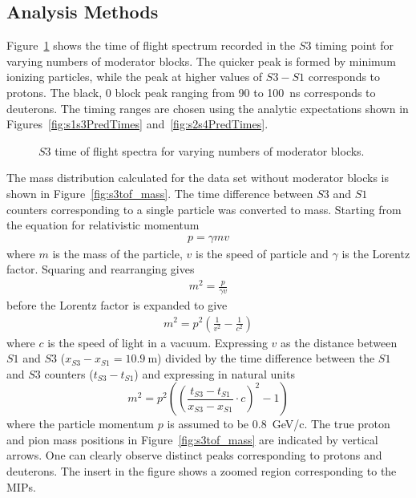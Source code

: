 \subsection{Analysis Methods}

Figure~\ref{fig:s3tof} shows the time of flight spectrum recorded in the $\mathit{S3}$ timing point for varying numbers of moderator blocks.
The quicker peak is formed by minimum ionizing particles, while the peak at higher values of $\mathit{S3} - \mathit{S1}$ corresponds to protons.
The black, 0 block peak ranging from 90 to 100~ns corresponds to deuterons.
The timing ranges are chosen using the analytic expectations shown in Figures~\ref{fig:s1s3PredTimes} and~\ref{fig:s2s4PredTimes}.

\begin{figure}[h]
  \begin{adjustbox}{max totalsize={.8\textwidth}{.5\textheight},center}
    
  \end{adjustbox}
  \caption{$\mathit{S3}$ time of flight spectra for varying numbers of moderator blocks.}
  \label{fig:s3tof}
\end{figure}

The mass distribution calculated for the data set without moderator blocks is shown in Figure~\ref{fig:s3tof_mass}.
The time difference between $\mathit{S3}$ and $\mathit{S1}$ counters corresponding to a single particle was converted to mass.
Starting from the equation for relativistic momentum
\begin{align}
p = \gamma m v
\end{align}
where $m$ is the mass of the particle, $v$ is the speed of particle and $\gamma$ is the Lorentz factor.
Squaring and rearranging gives
\begin{align}
m^{2} = \frac{p}{\gamma v}
\end{align}
before the Lorentz factor is expanded to give
\begin{align}
m^{2} = p^{2}\left(\frac{1}{v^{2}} - \frac{1}{c^{2}}\right)
\end{align}
where $c$ is the speed of light in a vacuum. Expressing $v$ as the distance between $\mathit{S1}$ and $\mathit{S3}$ ($x_{\mathit{S3}}-x_{\mathit{S1}} = 10.9~\text{m}$) divided by the time difference between the $\mathit{S1}$ and $\mathit{S3}$ counters ($t_{\mathit{S3}} - t_{\mathit{S1}}$) and expressing in natural units 
\begin{equation} 
m^2 = p^2 \left( 
\left(\frac{t_{\mathit{S3}}-t_{\mathit{S1}}}{x_{\mathit{S3}}-x_{\mathit{S1}}} \cdot c \right)^2
- 1  \right)
\label{eq:recoMass}
\end{equation}
where the particle momentum $p$ is assumed to be 0.8~GeV/c.
The true proton and pion mass positions in Figure~\ref{fig:s3tof_mass} are indicated by vertical arrows.
One can clearly observe distinct peaks corresponding to protons and deuterons. 
The insert in the figure shows a zoomed region corresponding to the MIPs. 

